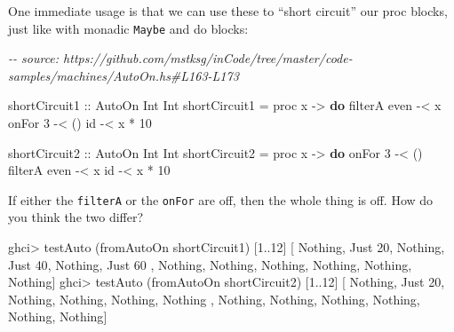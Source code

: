 \documentclass[]{article}
\newenvironment{Shaded}{}{}
\newcommand{\CommentTok}[1]{\textcolor[rgb]{0.38,0.63,0.69}{\textit{#1}}}
\newcommand{\DataTypeTok}[1]{\textcolor[rgb]{0.56,0.13,0.00}{#1}}
\newcommand{\DecValTok}[1]{\textcolor[rgb]{0.25,0.63,0.44}{#1}}
\newcommand{\FunctionTok}[1]{\textcolor[rgb]{0.02,0.16,0.49}{#1}}
\newcommand{\KeywordTok}[1]{\textcolor[rgb]{0.00,0.44,0.13}{\textbf{#1}}}
\newcommand{\NormalTok}[1]{#1}
\newcommand{\OperatorTok}[1]{\textcolor[rgb]{0.40,0.40,0.40}{#1}}
\newcommand{\OtherTok}[1]{\textcolor[rgb]{0.00,0.44,0.13}{#1}}
\begin{document}
One immediate usage is that we can use these to ``short circuit'' our proc
blocks, just like with monadic \texttt{Maybe} and do blocks:

\begin{Shaded}
\begin{Highlighting}[]
\CommentTok{{-}{-} source: https://github.com/mstksg/inCode/tree/master/code{-}samples/machines/AutoOn.hs\#L163{-}L173}

\OtherTok{shortCircuit1 ::} \DataTypeTok{AutoOn} \DataTypeTok{Int} \DataTypeTok{Int}
\NormalTok{shortCircuit1 }\OtherTok{=}\NormalTok{ proc x }\OtherTok{{-}\textgreater{}} \KeywordTok{do}
\NormalTok{    filterA }\FunctionTok{even} \OperatorTok{{-}\textless{}}\NormalTok{ x}
\NormalTok{    onFor }\DecValTok{3}      \OperatorTok{{-}\textless{}}\NormalTok{ ()}
    \FunctionTok{id}           \OperatorTok{{-}\textless{}}\NormalTok{ x }\OperatorTok{*} \DecValTok{10}

\OtherTok{shortCircuit2 ::} \DataTypeTok{AutoOn} \DataTypeTok{Int} \DataTypeTok{Int}
\NormalTok{shortCircuit2 }\OtherTok{=}\NormalTok{ proc x }\OtherTok{{-}\textgreater{}} \KeywordTok{do}
\NormalTok{    onFor }\DecValTok{3}      \OperatorTok{{-}\textless{}}\NormalTok{ ()}
\NormalTok{    filterA }\FunctionTok{even} \OperatorTok{{-}\textless{}}\NormalTok{ x}
    \FunctionTok{id}           \OperatorTok{{-}\textless{}}\NormalTok{ x }\OperatorTok{*} \DecValTok{10}
\end{Highlighting}
\end{Shaded}

If either the \texttt{filterA} or the \texttt{onFor} are off, then the whole
thing is off. How do you think the two differ?

\begin{Shaded}
\begin{Highlighting}[]
\NormalTok{ghci}\OperatorTok{\textgreater{}}\NormalTok{ testAuto (fromAutoOn shortCircuit1) [}\DecValTok{1}\OperatorTok{..}\DecValTok{12}\NormalTok{]}
\NormalTok{[ }\DataTypeTok{Nothing}\NormalTok{, }\DataTypeTok{Just} \DecValTok{20}\NormalTok{, }\DataTypeTok{Nothing}\NormalTok{, }\DataTypeTok{Just} \DecValTok{40}\NormalTok{, }\DataTypeTok{Nothing}\NormalTok{, }\DataTypeTok{Just} \DecValTok{60}
\NormalTok{, }\DataTypeTok{Nothing}\NormalTok{, }\DataTypeTok{Nothing}\NormalTok{, }\DataTypeTok{Nothing}\NormalTok{, }\DataTypeTok{Nothing}\NormalTok{, }\DataTypeTok{Nothing}\NormalTok{, }\DataTypeTok{Nothing}\NormalTok{]}
\NormalTok{ghci}\OperatorTok{\textgreater{}}\NormalTok{ testAuto (fromAutoOn shortCircuit2) [}\DecValTok{1}\OperatorTok{..}\DecValTok{12}\NormalTok{]}
\NormalTok{[ }\DataTypeTok{Nothing}\NormalTok{, }\DataTypeTok{Just} \DecValTok{20}\NormalTok{, }\DataTypeTok{Nothing}\NormalTok{, }\DataTypeTok{Nothing}\NormalTok{, }\DataTypeTok{Nothing}\NormalTok{, }\DataTypeTok{Nothing}
\NormalTok{, }\DataTypeTok{Nothing}\NormalTok{, }\DataTypeTok{Nothing}\NormalTok{, }\DataTypeTok{Nothing}\NormalTok{, }\DataTypeTok{Nothing}\NormalTok{, }\DataTypeTok{Nothing}\NormalTok{, }\DataTypeTok{Nothing}\NormalTok{]}
\end{Highlighting}
\end{Shaded}
\end{document}
